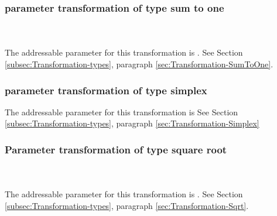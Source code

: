 \subsubsection{parameter transformation of type sum to one}
\label{syntax:Transformation-SumToOne} \\~\\
The addressable parameter for this transformation is . See Section \ref{subsec:Transformation-types}, paragraph \ref{sec:Transformation-SumToOne}.

\subsubsection{parameter transformation of type simplex}
\label{syntax:Transformation-Simplex}


The addressable parameter for this transformation is  See Section \ref{subsec:Transformation-types}, paragraph \ref{sec:Transformation-Simplex}

\subsubsection{Parameter transformation of type square root}
\label{syntax:Transformation-Sqrt} \\~\\
The addressable parameter for this transformation is . See Section \ref{subsec:Transformation-types}, paragraph \ref{sec:Transformation-Sqrt}.
